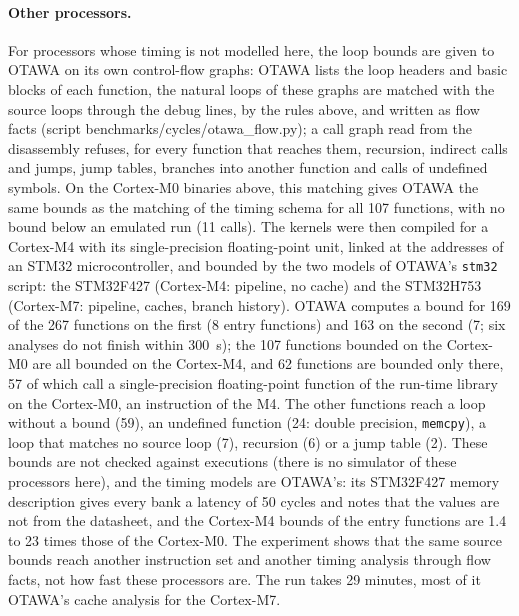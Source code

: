 \documentclass[oneside,english]{amsart}
\numberwithin{equation}{section}
\theoremstyle{plain}
\theoremstyle{definition}
\theoremstyle{plain}
\theoremstyle{plain}
\theoremstyle{remark}
\newcommand{\lean}[1]{{\ttfamily\small #1}}
\begin{document}
\paragraph{Other processors.}
For processors whose timing is not modelled here, the loop bounds are given to OTAWA on its own control-flow graphs: OTAWA lists the loop headers and basic blocks of each function, the natural loops of these graphs are matched with the source loops through the debug lines, by the rules above, and written as flow facts (script \lean{benchmarks/cycles/otawa\_flow.py}); a call graph read from the disassembly refuses, for every function that reaches them, recursion, indirect calls and jumps, jump tables, branches into another function and calls of undefined symbols. On the Cortex-M0 binaries above, this matching gives OTAWA the same bounds as the matching of the timing schema for all 107 functions, with no bound below an emulated run (11 calls). The kernels were then compiled for a Cortex-M4 with its single-precision floating-point unit, linked at the addresses of an STM32 microcontroller, and bounded by the two models of OTAWA's \texttt{stm32} script: the STM32F427 (Cortex-M4: pipeline, no cache) and the STM32H753 (Cortex-M7: pipeline, caches, branch history). OTAWA computes a bound for 169 of the 267 functions on the first (8 entry functions) and 163 on the second (7; six analyses do not finish within 300~s); the 107 functions bounded on the Cortex-M0 are all bounded on the Cortex-M4, and 62 functions are bounded only there, 57 of which call a single-precision floating-point function of the run-time library on the Cortex-M0, an instruction of the M4. The other functions reach a loop without a bound (59), an undefined function (24: double precision, \texttt{memcpy}), a loop that matches no source loop (7), recursion (6) or a jump table (2). These bounds are not checked against executions (there is no simulator of these processors here), and the timing models are OTAWA's: its STM32F427 memory description gives every bank a latency of 50 cycles and notes that the values are not from the datasheet, and the Cortex-M4 bounds of the entry functions are 1.4 to 23 times those of the Cortex-M0. The experiment shows that the same source bounds reach another instruction set and another timing analysis through flow facts, not how fast these processors are. The run takes 29 minutes, most of it OTAWA's cache analysis for the Cortex-M7.
\end{document}
